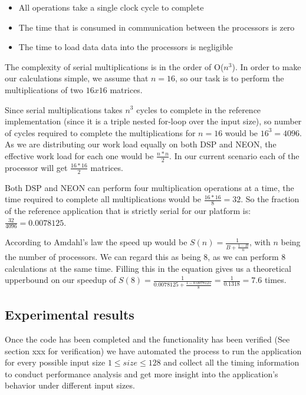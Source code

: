 \begin{itemize}
\item All operations take a single clock cycle to complete
\item The time that is consumed in communication between the processors is zero
\item The time to load data data into the processors is negligible
\end{itemize}

The complexity of serial multiplications is in the order of O($n^3$). In order to make our calculations simple, we assume that $n = 16$, so our task is to perform the multiplications of two $16x16$ matrices.

Since serial multiplications takes $n^3$ cycles to complete in the reference implementation (since it is a triple nested for-loop over the input size), so number of cycles required to complete the multiplications for $n = 16$ would be $16^3 = 4096$. As we are distributing our work load equally on both DSP and NEON, the effective work load for each one would be $\frac{n * n}{2}$. In our current scenario each of the processor will get $\frac{16 * 16}{2}$ matrices.

Both DSP and NEON can perform four multiplication operations at a time, the time required to complete all multiplications would be $\frac{16*16}{8} = 32$. So the fraction of the reference application that is strictly serial for our platform is: $\frac{32}{4096} = 0.0078125$.

According to Amdahl's law the speed up would be $S(n) = \frac{1}{B + \frac{1 - B}{n}}$, with $n$ being the number of processors. We can regard this as being 8, as we can perform 8 calculations at the same time. Filling this in the equation gives us a theoretical upperbound on our speedup of $S(8) = \frac{1}{{0.0078125 + \frac{1 - 0.0078125}{8}}} = \frac{1}{0.1318} = 7.6$ times.

\subsection{Experimental results}

Once the code has been completed and the functionality has been verified (See section xxx for verification) we have automated the process to run the application for every possible input size $1 \leq size \leq 128$ and collect all the timing information to conduct performance analysis and get more insight into the application's behavior under different input sizes.

